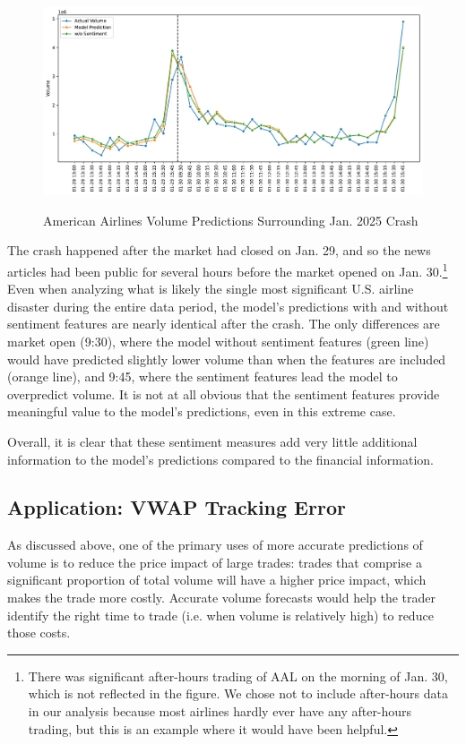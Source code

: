\documentclass[12pt]{article}
\begin{document}
\begin{figure}[H]
    \centering
    \caption{American Airlines Volume Predictions Surrounding Jan. 2025 Crash}
    \includegraphics[width=\linewidth]{../Output/shap_aal_crash.pdf}
    \label{fig:shapley_aal_crash}
\end{figure}

The crash happened after the market had closed on Jan. 29, and so the news articles had been public for several hours before the market opened on Jan. 30.\footnote{There was significant after-hours trading of AAL on the morning of Jan. 30, which is not reflected in the figure. We chose not to include after-hours data in our analysis because most airlines hardly ever have any after-hours trading, but this is an example where it would have been helpful.} Even when analyzing what is likely the single most significant U.S. airline disaster during the entire data period, the model's predictions with and without sentiment features are nearly identical after the crash. The only differences are market open (9:30), where the model without sentiment features (green line) would have predicted slightly lower volume than when the features are included (orange line), and 9:45, where the sentiment features lead the model to overpredict volume. It is not at all obvious that the sentiment features provide meaningful value to the model's predictions, even in this extreme case.

Overall, it is clear that these sentiment measures add very little additional information to the model's predictions compared to the financial information.

\subsection{Application: VWAP Tracking Error}
As discussed above, one of the primary uses of more accurate predictions of volume is to reduce the price impact of large trades: trades that comprise a significant proportion of total volume will have a higher price impact, which makes the trade more costly. Accurate volume forecasts would help the trader identify the right time to trade (i.e. when volume is relatively high) to reduce those costs.
\end{document}
